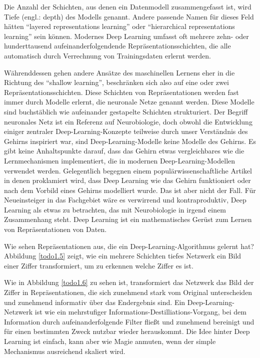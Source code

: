 Die Anzahl der Schichten, aus denen ein Datenmodell zusammengefasst ist, wird Tiefe (engl.: depth) des Modells genannt. Andere passende Namen für dieses Feld hätten ``layered representations learning'' oder ``hierarchical representations learning'' sein können. Modernes Deep Learning umfasst oft mehrere zehn- oder hunderttausend aufeinanderfolgendende Repräsentationsschichten, die alle automatisch durch Verrechnung von Trainingsdaten erlernt werden.

Währenddessen gehen andere Ansätze des maschinellen Lernens eher in die Richtung des ``shallow learning'', beschränken sich also auf eine oder zwei Repräsentationsschichten. Diese Schichten von Repräsentationen werden fast immer durch Modelle erlernt, die neuronale Netze genannt werden. Diese Modelle sind buchstäblich wie aufeinander gestapelte Schichten strukturiert. Der Begriff neuronales Netz ist ein Referenz auf Neurobiologie, doch obwohl die Entwicklung einiger zentraler Deep-Learning-Konzepte teilweise durch unser Verständnis des Gehirns inspiriert war, sind Deep-Learning-Modelle keine Modelle des Gehirns. Es gibt keine Anhaltspunkte darauf, dass das Gehirn etwas vergleichbares wie die Lernmechanismen implementiert, die in modernen Deep-Learning-Modellen verwendet werden. Gelegentlich begegnen einem populärwissenschaftliche Artikel in denen proklamiert wird, dass Deep Learning wie das Gehirn funktioniert oder nach dem Vorbild eines Gehirns modelliert wurde. Das ist aber nicht der Fall. Für Neueinsteiger in das Fachgebiet wäre es verwirrend und kontraproduktiv, Deep Learning als etwas zu betrachten, das mit Neurobiologie in irgend einem Zusammenhang steht. Deep Learning ist ein mathematisches Gerüst zum Lernen von Repräsentationen von Daten.

Wie sehen Repräsentationen aus, die ein Deep-Learning-Algorithmus gelernt hat? Abbildung \ref{todo1.5} zeigt, wie ein mehrere Schichten tiefes Netzwerk ein Bild einer Ziffer transformiert, um zu erkennen welche Ziffer es ist.

Wie in Abbildung \ref{todo1.6} zu sehen ist, transformiert das Netzwerk das Bild der Ziffer in Repräsentationen, die sich zunehmend stark vom Original unterscheiden und zunehmend informativ über das Endergebnis sind. Ein Deep-Learning-Netzwerk ist wie ein mehrstufiger Informations-Destilliations-Vorgang, bei dem Information durch aufeinanderfolgende Filter fließt und zunehmend bereinigt und für einen bestimmten Zweck nutzbar wieder herauskommt. Die Idee hinter Deep Learning ist einfach, kann aber wie Magie anmuten, wenn der simple Mechanismus ausreichend skaliert wird.

